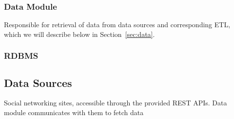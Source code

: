 \subsubsection{Data Module}
Responsible for retrieval of data from data sources and corresponding ETL, which
we will describe below in Section~\ref{sec:data}.
\subsubsection{RDBMS}

\subsection{Data Sources}
Social networking sites, accessible through the provided REST APIs. Data module
communicates with them to fetch data
